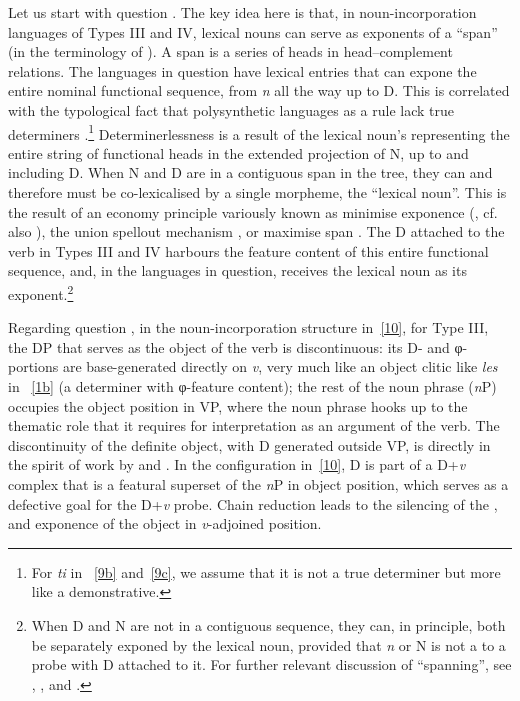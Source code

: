 \documentclass[output=paper]{langsci/langscibook}
\begin{document}
\begin{refcontext}
Let us start with question . The key idea here is that, in
noun-in\-cor\-po\-ra\-tion languages of Types III and IV, lexical nouns can serve as
exponents of a \enquote{span} (in the terminology of ).  A span is a
series of heads in head--complement relations. The languages in question have
lexical entries that can expone the entire nominal functional sequence, from
\emph{n} all the way up to D.  This is correlated with the typological fact
that polysynthetic languages as a rule lack true determiners
\citep{baker96}.\footnote{For \emph{ti} in ~\eqref{9b} and~\eqref{9c}, we
assume that it is not a true determiner but more like a demonstrative.}
Determinerlessness is a result of the lexical noun's representing the entire
string of functional heads in the extended projection of N, up to and including
D. When N and D are in a contiguous span in the tree, they can and therefore
must be co-lexicalised by a single morpheme, the \enquote{lexical noun}. This is the
result of an economy principle variously known as minimise exponence
(\citealt{siddiqi}, cf. also \citealt{noyer93}), the union spellout mechanism
\citep{muriungiunionspo}, or maximise span \citep{pantchevalocationsourcegoal}.
The D attached to the verb in Types III and IV harbours the feature content of
this entire functional sequence, and, in the languages in question, receives
the lexical noun as its exponent.\footnote{When D and N are not in a contiguous
    sequence, they can, in principle, both be separately exponed by the lexical
    noun, provided that \emph{n} or N is not a  to a probe with D
attached to it. For further relevant discussion of \enquote{spanning}, see
\citet{ramchand08}, \citet{taraldnguni}, \citet{merchant15} and
\citet{svenonius16}.}

Regarding question , in the noun-incorporation structure
in~\eqref{10}, for Type III, the DP that serves as the object of the verb is
discontinuous: its D- and φ{}-portions are base-generated directly on \emph{v},
very much like an object clitic like \emph{les} in ~\eqref{1b} (a
determiner with φ-feature content); the rest of the noun phrase (\emph{n}P)
occupies the object position in VP, where the noun phrase hooks up to the
thematic role that it requires for interpretation as an argument of the verb.
The discontinuity of the definite object, with D generated outside VP, is
directly in the spirit of work by \citet{sportiche98} and \citet{lin00}. In the
configuration in~\eqref{10}, D is part of a D+\emph{v} complex that is a
featural superset of the \emph{n}P in object position, which serves as a
defective goal for the D+\emph{v} probe.  Chain reduction leads to the
silencing of the , and exponence of the object in
\emph{v}-adjoined position.


\end{refcontext}
\end{document}
